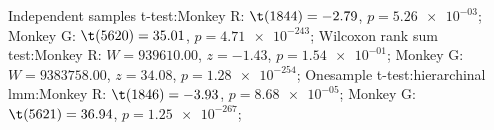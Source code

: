 Independent samples t-test:Monkey R: $\t(1844) = -2.79$, $p = \num{5.26e-03}$; 
Monkey G: $\t(5620) = 35.01$, $p = \num{4.71e-243}$; 
Wilcoxon rank sum test:Monkey R: $W = 939610.00$, $z = -1.43$, $p = \num{1.54e-01}$; 
Monkey G: $W = 9383758.00$, $z = 34.08$, $p = \num{1.28e-254}$; 
Onesample t-test:hierarchinal lmm:Monkey R: $\t(1846) = -3.93$, $p = \num{8.68e-05}$; 
Monkey G: $\t(5621) = 36.94$, $p = \num{1.25e-267}$; 
